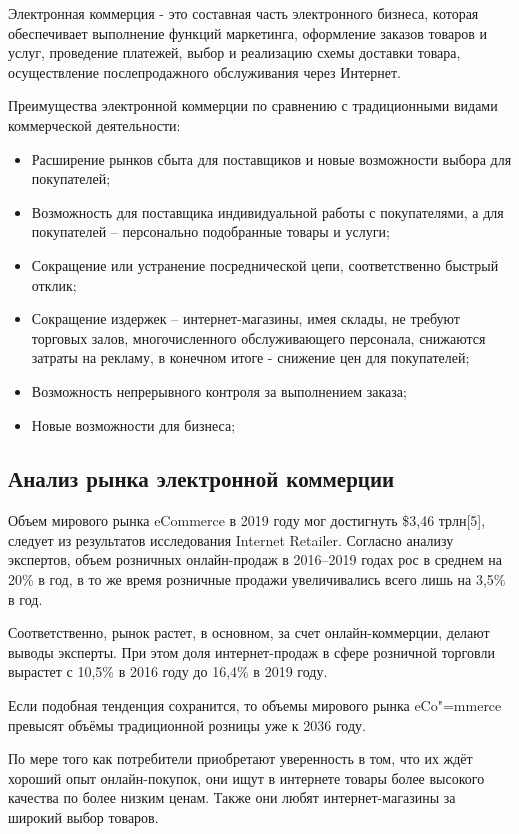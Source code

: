 Электронная коммерция - это составная часть электронного бизнеса, которая обеспечивает выполнение функций маркетинга, оформление заказов товаров и услуг, проведение платежей, выбор и реализацию схемы доставки товара, осуществление послепродажного обслуживания через Интернет.

Преимущества электронной коммерции по сравнению с традиционными видами коммерческой деятельности:
\begin{itemize}
  \item Расширение рынков сбыта для поставщиков и новые возможности выбора для покупателей;
  \item Возможность для поставщика индивидуальной работы с покупателями, а для покупателей – персонально подобранные товары и услуги;
  \item Сокращение или устранение посреднической цепи, соответственно быстрый отклик;
  \item Сокращение издержек – интернет-магазины, имея склады, не требуют торговых залов, многочисленного обслуживающего персонала, снижаются затраты на рекламу, в конечном итоге - снижение цен для покупателей;
  \item Возможность непрерывного контроля за выполнением заказа;
  \item Новые возможности для бизнеса;
\end{itemize}

\subsection{Анализ рынка электронной коммерции}
Объем мирового рынка eCommerce в 2019 году мог достигнуть \$3,46 трлн[5], следует из результатов исследования Internet Retailer.
Согласно анализу экспертов, объем розничных онлайн-продаж в 2016–2019 годах рос в среднем на 20\% в год, в то же время розничные продажи увеличивались всего лишь на 3,5\% в год.

Соответственно, рынок растет, в основном, за счет онлайн-коммерции, делают выводы эксперты. При этом доля интернет-продаж в сфере розничной торговли вырастет с 10,5\% в 2016 году до 16,4\% в 2019 году.

Если подобная тенденция сохранится, то объемы мирового рынка eCo"=mmerce превысят объёмы традиционной розницы уже к 2036 году.

По мере того как потребители приобретают уверенность в том, что их ждёт хороший опыт онлайн-покупок, они ищут в интернете товары более высокого качества по более низким ценам.
Также они любят интернет-магазины за широкий выбор товаров.

